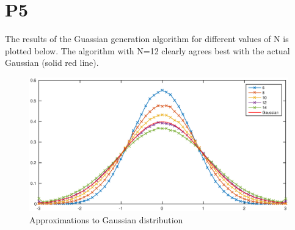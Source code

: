 \documentclass[a4paper,11pt]{article}
\numberwithin{equation}{section}
\begin{document}
\section{P5}
The results of the Guassian generation algorithm for different values of N is plotted below.
The algorithm with N=12 clearly agrees best with the actual Gaussian (solid red line).
\begin{figure}[h]
 \caption{Approximations to Gaussian distribution}
 \centering
   \includegraphics[width=\textwidth]{p5_gaussians}
\end{figure}
\end{document}
